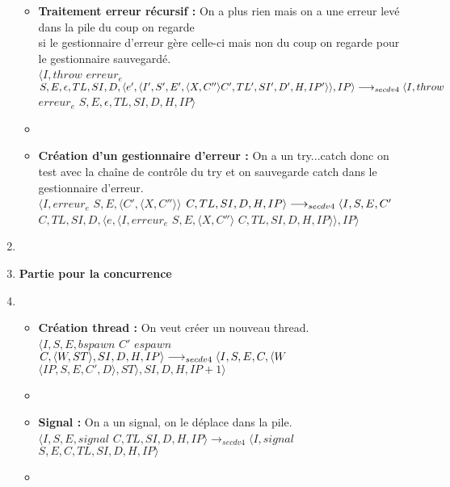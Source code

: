 \documentclass[10pt,a4paper]{article}
\begin{document}
\begin{enumerate}
\begin{itemize}
			    	\item[]  \textbf{Traitement erreur récursif :} On a plus rien mais on a une erreur levé dans la pile du coup on regarde 
			    	\\si le gestionnaire d'erreur gère celle-ci mais non du coup on regarde pour le gestionnaire sauvegardé.
			    	\\ $\langle I,throw$ $erreur_{e}$ $S,E,\epsilon,TL,SI,D,\langle e',\langle I',S',E',\langle X,C'' \rangle C',TL',SI',D',H,IP'\rangle\rangle,IP\rangle \\\longrightarrow_{secdv4}\langle I,throw$ $erreur_{e}$ $S,E,\epsilon,TL,SI,D,H,IP\rangle$
			    	\item[]
			    	\newpage
			    	
			    	\item[]  \textbf{Création d'un gestionnaire d'erreur :} On a un try...catch donc on test avec la chaîne de contrôle du try et on sauvegarde catch dans le gestionnaire d'erreur.
			    	\\ $\langle I,erreur_{e}$ $S,E,\langle C',\langle X,C''\rangle\rangle$ $C,TL,SI,D,H,IP\rangle 
			    	\\\longrightarrow_{secdv4} \langle I,S,E,C'$ $C,TL,SI,D,\langle e,\langle I,erreur_{e}$ $S,E,\langle X,C'' \rangle$ $C,TL,SI,D,H,IP\rangle\rangle,IP\rangle$
			    \end{itemize}
			    
			    \item[]
			
			    
			 
			    
			    \item[] \textbf{Partie pour la concurrence} 
			    \item[]
			    \begin{itemize}
			    	\item[]  \textbf{Création thread :} On veut créer un nouveau thread.
			    	\\ $\langle I,S,E,bspawn$ $C'$ $espawn$ $C,\langle W,ST\rangle,SI,D,H,IP\rangle 
			    	\\\longrightarrow_{secdv4} \langle I,S,E,C,\langle W$ $\langle IP,S,E,C',D\rangle,ST\rangle,SI,D,H,IP+1\rangle$
			    	\item[]
			    	
			    	\item[]  \textbf{Signal :} On a un signal, on le déplace dans la pile.
			    	\\ $\langle I,S,E,signal$ $C,TL,SI,D,H,IP\rangle
			    	\longrightarrow_{secdv4} \langle I,signal$ $S,E,C,TL,SI,D,H,IP\rangle$
			    	\item[]
			    	

\end{itemize}
\end{enumerate}
\end{document}
